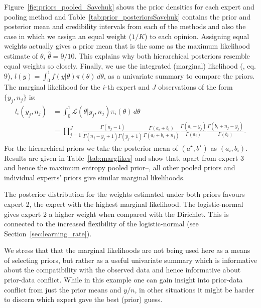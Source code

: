 \documentclass[a4paper, notitlepage, 11pt]{article}
\begin{document}
Figure~\ref{fig:priors_pooled_Savchuk} shows the prior densities for each expert and pooling method and Table~\ref{tab:prior_posteriorsSavchuk} contains the prior and posterior mean and credibility intervals from each of the methods and also the case in which we assign an equal weight ($1/K$) to each opinion.
Assigning equal weights actually gives a prior mean that is the same as the maximum likelihood estimate of $\theta$, $\hat{\theta} = 9/ 10$.
This explains why both hierarchical posteriors resemble equal weights so closely.
Finally, we use the integrated (marginal) likelihood (\cite{Raftery2007}, eq. 9), $l(y) = \int_{0}^{1}f(y|\theta)\pi(\theta)\, d\theta$, as a univariate summary to compare the priors.
The marginal likelihood for the $i$-th expert and $J$ observations of the form $\{ y_j, n_j\}$ is:
\begin{align}
  \label{eq:marglike}
l_i(y_j, n_j) &= \int_{0}^{1}\mathcal{L}(\theta|y_j, n_j)\pi_i(\theta)\, d\theta\nonumber\\
 &= \prod_{j = 1}^{J}\frac{\Gamma(n_j-1)}{\Gamma(n_j-y_j + 1)\Gamma(y_j+1)}\frac{\Gamma(a_i + b_i)}{\Gamma(a_i + b_i + n_j)}\frac{\Gamma(a_i + y_j)}{\Gamma(a_i)}\frac{\Gamma(b_i + n_j - y_j) }{\Gamma(b_i)}.
 \end{align}
For the hierarchical priors we take the posterior mean of $(a^\star, b^\star)$ as $(a_i, b_i)$.
Results are given in Table~\ref{tab:marglikes} and show that, apart from expert $3$ -- and hence the maximum entropy pooled prior--, all other pooled priors and individual experts' priors give similar marginal likelihoods.

The posterior distribution for the weights estimated under both priors favours expert 2, the expert with the highest marginal likelihood.
The logistic-normal gives expert 2 a higher weight when compared with the Dirichlet.
This is connected to the increased flexibility of the logistic-normal (see Section~\ref{sec:learning_rate}).

We stress that that the marginal likelihoods are not being used here as a means of selecting priors, but rather as a useful univariate summary which is informative about the compatibility with the observed data and hence informative about prior-data conflict.
While in this example one can gain insight into prior-data conflict from just the prior means and $y/n$, in other situations it might be harder to discern which expert gave the best (prior) guess.
\end{document}
